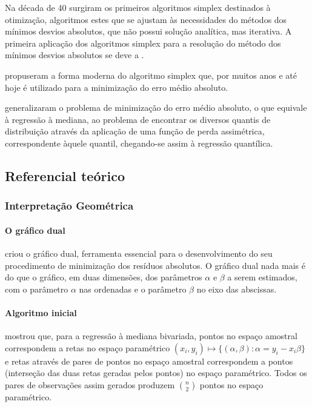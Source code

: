 \documentclass[a4paper, 12pt]{article}
\let\oldparagraph\paragraph
\renewcommand{\paragraph}[1]{\oldparagraph{#1}\mbox{}}
\begin{document}
Na década de 40 surgiram os primeiros algoritmos simplex destinados à
otimização, algoritmos estes que se ajustam às necessidades do métodos
dos mínimos desvios absolutos, que não possui solução analítica, mas
iterativa. A primeira aplicação dos algoritmos simplex para a resolução
do método dos mínimos desvios absolutos se deve a \textcite{charnes}
\autocites[ver][281]{tortoise}[4]{conopt}.

\textcite{barrodale} propuseram a forma moderna do algoritmo simplex
que, por muitos anos e até hoje é utilizado para a minimização do erro
médio absoluto.

\textcite{koenker1978} generalizaram o problema de minimização do erro
médio absoluto, o que equivale à regressão à mediana, ao problema de
encontrar os diversos quantis de distribuição através da aplicação de
uma função de perda assimétrica, correspondente àquele quantil,
chegando-se assim à regressão quantílica.

\hypertarget{referencial-teorico}{%
\subsection{Referencial teórico}\label{referencial-teorico}}

\hypertarget{interpretacao-geometrica}{%
\subsubsection{Interpretação
Geométrica}\label{interpretacao-geometrica}}

\hypertarget{o-grafico-dual}{%
\paragraph{O gráfico dual}\label{o-grafico-dual}}

\textcite{edgeworth} criou o gráfico dual, ferramenta essencial para o
desenvolvimento do seu procedimento de minimização dos resíduos
absolutos. O gráfico dual nada mais é do que o gráfico, em duas
dimensões, dos parâmetros \(\alpha\) e \(\beta\) a serem estimados, com
o parâmetro \(\alpha\) nas ordenadas e o parâmetro \(\beta\) no eixo das
abscissas.

\hypertarget{algoritmo-inicial}{%
\paragraph{Algoritmo inicial}\label{algoritmo-inicial}}

\textcite{edgeworth1888} mostrou que, para a regressão à mediana
bivariada, pontos no espaço amostral correspondem a retas no espaço
paramétrico
\((x_i, y_i) \mapsto \{(\alpha, \beta): \alpha = y_i - x_i \beta\}\) e
retas através de pares de pontos no espaço amostral correspondem a
pontos (interseção das duas retas geradas pelos pontos) no espaço
paramétrico. Todos os pares de observações assim gerados produzem
\(\binom{n}{2}\) pontos no espaço paramétrico.
\end{document}
